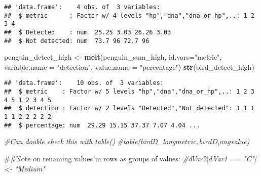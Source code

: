 \documentclass[]{article}
\newenvironment{Shaded}{\begin{snugshade}}{\end{snugshade}}
\newcommand{\KeywordTok}[1]{\textcolor[rgb]{0.13,0.29,0.53}{\textbf{#1}}}
\newcommand{\DataTypeTok}[1]{\textcolor[rgb]{0.13,0.29,0.53}{#1}}
\newcommand{\DecValTok}[1]{\textcolor[rgb]{0.00,0.00,0.81}{#1}}
\newcommand{\StringTok}[1]{\textcolor[rgb]{0.31,0.60,0.02}{#1}}
\newcommand{\CommentTok}[1]{\textcolor[rgb]{0.56,0.35,0.01}{\textit{#1}}}
\newcommand{\OtherTok}[1]{\textcolor[rgb]{0.56,0.35,0.01}{#1}}
\newcommand{\OperatorTok}[1]{\textcolor[rgb]{0.81,0.36,0.00}{\textbf{#1}}}
\newcommand{\NormalTok}[1]{#1}
\begin{document}
\begin{Shaded}
\end{Shaded}

\begin{verbatim}
## 'data.frame':    4 obs. of  3 variables:
##  $ metric      : Factor w/ 4 levels "hp","dna","dna_or_hp",..: 1 2 3 4
##  $ Detected    : num  25.25 3.03 26.26 3.03
##  $ Not detected: num  73.7 96 72.7 96
\end{verbatim}

\begin{Shaded}
\begin{Highlighting}[]
\NormalTok{penguin_detect_high <-}\StringTok{ }\KeywordTok{melt}\NormalTok{(penguin_sum_high, }\DataTypeTok{id.vars=}\StringTok{"metric"}\NormalTok{, }\DataTypeTok{variable.name =} \StringTok{"detection"}\NormalTok{, }\DataTypeTok{value.name =} \StringTok{"percentage"}\NormalTok{)}
\KeywordTok{str}\NormalTok{(bird_detect_high)}
\end{Highlighting}
\end{Shaded}

\begin{verbatim}
## 'data.frame':    10 obs. of  3 variables:
##  $ metric    : Factor w/ 5 levels "hp","dna","dna_or_hp",..: 1 2 3 4 5 1 2 3 4 5
##  $ detection : Factor w/ 2 levels "Detected","Not detected": 1 1 1 1 1 2 2 2 2 2
##  $ percentage: num  29.29 15.15 37.37 7.07 4.04 ...
\end{verbatim}

\begin{Shaded}
\begin{Highlighting}[]
\CommentTok{#Can double check this with table()}
\CommentTok{#table(birdD_long$metric, birdD_long$value)}

\NormalTok{##Note on renaming values in rows as groups of values:}
\CommentTok{#d$Var2[d$Var1 == "C"] <- "Medium"}
\end{Highlighting}
\end{Shaded}
\end{document}
